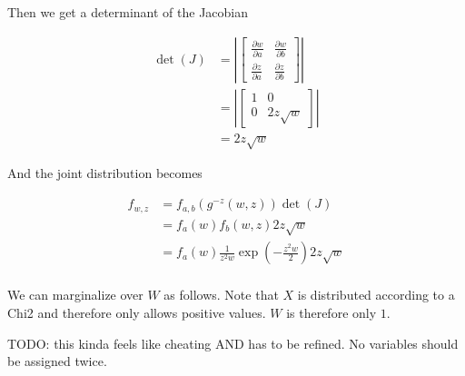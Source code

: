 Then we get a determinant of the Jacobian

\begin{align*}
	\det(J) &= \left|\begin{bmatrix}
			\frac{\partial w}{\partial a} & \frac{\partial w}{\partial b} \\
			\frac{\partial z}{\partial a} & \frac{\partial z}{\partial b}
			\end{bmatrix}\right| \\
			&= \left|\begin{bmatrix}
			1 & 0 \\
			0 & 2z \sqrt{w}
			\end{bmatrix}\right| \\
			&= 2z \sqrt{w}
\end{align*}

And the joint distribution becomes 

\begin{align*}
	f_{w,z} &=  f_{a,b}(g^{-z}(w,z)) \det(J) \\
	&= f_a(w) f_b(w,z) 2z \sqrt{w} \\
	&= f_a(w) \frac{1}{z^2 w} \exp \left(-\frac{z^2 w}{2}\right) 2z \sqrt{w} \\
\end{align*}

We can marginalize over $W$ as follows. Note that $X$ is distributed according to a Chi2 and therefore only allows positive values. $W$ is therefore only $1$. 


TODO: this kinda feels like cheating AND has to be refined. No variables should be assigned twice. 